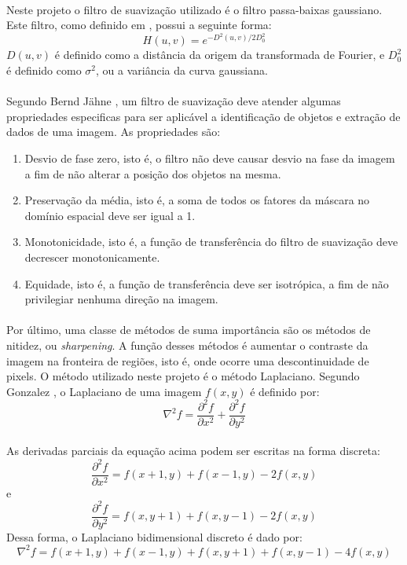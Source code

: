 \paragraph{}Neste projeto o filtro de suavização utilizado é o filtro passa-baixas gaussiano. Este filtro, como definido em \cite{Gonzalez92}, possui a seguinte forma:
\[
H(u,v) = e^{-D^{2}(u,v)/2D^{2}_{0}}
\]
\noindent{}\(D(u,v)\) é definido como a distância da origem da transformada de Fourier, e \(D^{2}_{0}\) é definido como \(\sigma^{2}\), ou a variância da curva gaussiana.
\paragraph{}Segundo Bernd Jähne \cite{Jahne02}, um filtro de suavização deve atender algumas propriedades especificas para ser aplicável a identificação de objetos e extração de dados de uma imagem. As propriedades são:
\begin{enumerate}
\item Desvio de fase zero, isto é, o filtro não deve causar desvio na fase da imagem a fim de não alterar a posição dos objetos na mesma.
\item Preservação da média, isto é, a soma de todos os fatores da máscara no domínio espacial deve ser igual a 1.
\item Monotonicidade, isto é, a função de transferência do filtro de suavização deve decrescer monotonicamente.
\item Equidade, isto é, a função de transferência deve ser isotrópica, a fim de não privilegiar nenhuma direção na imagem.
\end{enumerate}
\paragraph{}Por último, uma classe de métodos de suma importância são os métodos de nitidez, ou \textit{sharpening}. A função desses métodos é aumentar o contraste da imagem na fronteira de regiões, isto é, onde ocorre uma descontinuidade de pixels. O método utilizado neste projeto é o método Laplaciano. Segundo Gonzalez \cite{Gonzalez92}, o Laplaciano de uma imagem \(f(x,y)\) é definido por:
\[
        \nabla^{2}f = \frac{\partial^{2}f}{\partial x^{2}} + \frac{\partial^{2}f}{\partial y^{2}}
\]
\paragraph{}As derivadas parciais da equação acima podem ser escritas na forma discreta:
\[
        \frac{\partial^{2}f}{\partial x^{2}} = f(x + 1,y) + f(x - 1,y) - 2f(x,y)
\]
\noindent{}e
\[
        \frac{\partial^{2}f}{\partial y^{2}} = f(x,y + 1) + f(x,y - 1) - 2f(x,y)
\]
\noindent{}\newline{}Dessa forma, o Laplaciano bidimensional discreto é dado por:
\[ 
        \nabla^{2}f = f(x + 1,y) + f(x - 1,y) + f(x,y + 1) + f(x,y - 1) - 4f(x,y) 
\]
